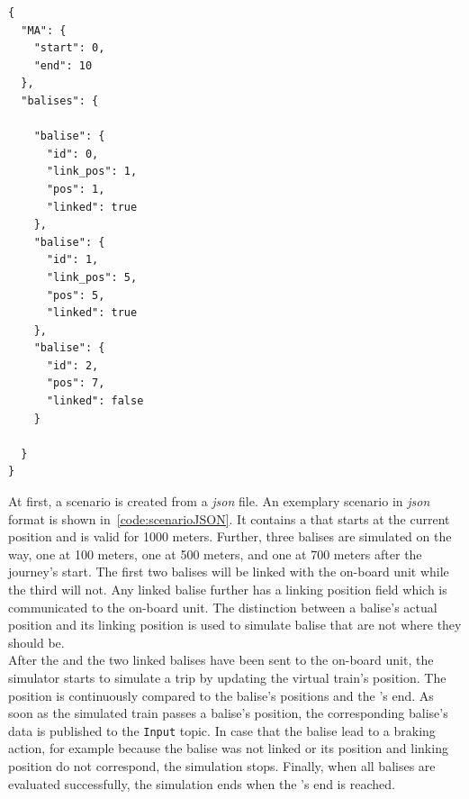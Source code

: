 \begin{lstlisting}[caption={A JSON scenario representation. Each scenario consists of a \glsentryfull{MA} with a start and end point, as well as of a set of balises. Balises can be either linked or not and consist of an identification number, a linking position and an actual position. The linking position is transmitted to the on-board unit and is distinguished from its actual position to simulate a misplaced balise.}, label=code:scenarioJSON]
{
  "MA": {
    "start": 0,
    "end": 10
  },
  "balises": {

    "balise": {
      "id": 0,
      "link_pos": 1,
      "pos": 1,
      "linked": true
    },
    "balise": {
      "id": 1,
      "link_pos": 5,
      "pos": 5,
      "linked": true
    },
    "balise": {
      "id": 2,
      "pos": 7,
      "linked": false
    }

  }
}

\end{lstlisting}

At first, a scenario is created from a \textit{json} file.
An exemplary scenario in \textit{json} format is shown in~\autoref{code:scenarioJSON}.
It contains a  that starts at the current position and is valid for 1000 meters.
Further, three balises are simulated on the way, one at 100 meters, one at 500 meters, and one at 700 meters after the journey's start.
The first two balises will be linked with the on-board unit while the third will not.
Any linked balise further has a linking position field which is communicated to the on-board unit.
The distinction between a balise's actual position and its linking position is used to simulate balise that are not where they should be.
\\

After the  and the two linked balises have been sent to the on-board unit, the simulator starts to simulate a trip by updating the virtual train's position.
The position is continuously compared to the balise's positions and the 's end.
As soon as the simulated train passes a balise's position, the corresponding balise's data is published to the \texttt{Input} topic.
In case that the balise lead to a braking action, for example because the balise was not linked or its position and linking position do not correspond, the simulation stops.
Finally, when all balises are evaluated successfully, the simulation ends when the 's end is reached.
\\

